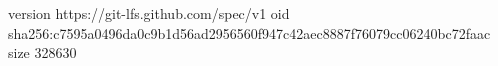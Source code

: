 version https://git-lfs.github.com/spec/v1
oid sha256:c7595a0496da0c9b1d56ad2956560f947c42aec8887f76079cc06240bc72faac
size 328630
